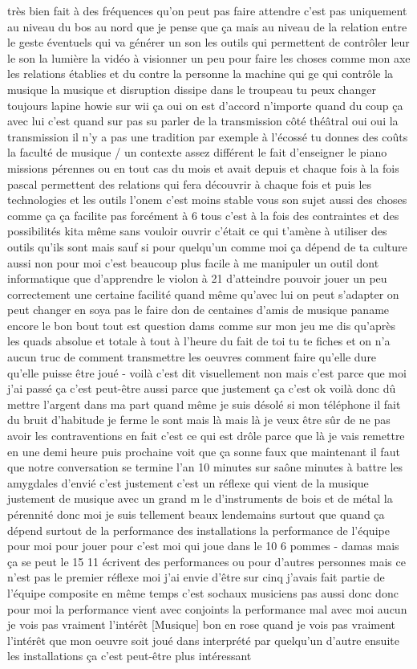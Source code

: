 très bien fait à des fréquences qu'on peut pas faire attendre c'est pas uniquement au niveau du bos au nord que je pense que ça mais au niveau de la relation entre le geste éventuels qui va générer un son les outils qui permettent de contrôler leur le son la lumière la vidéo à visionner un peu pour faire les choses comme mon axe les relations établies et du contre la personne la machine qui ge qui contrôle la musique la musique et disruption dissipe dans le troupeau tu peux changer toujours lapine howie sur wii ça oui on est d'accord n'importe quand du coup ça avec lui c'est quand sur pas su parler de la transmission côté théâtral oui oui la transmission il n'y a pas une tradition par exemple à l'écossé tu donnes des coûts la faculté de musique / un contexte assez différent le fait d'enseigner le piano missions pérennes ou en tout cas du mois et avait depuis et chaque fois à la fois pascal permettent des relations qui fera découvrir à chaque fois et puis les technologies et les outils l'onem c'est moins stable vous son sujet aussi des choses comme ça ça facilite pas forcément à 6 tous c'est à la fois des contraintes et des possibilités kita même sans vouloir ouvrir c'était ce qui t'amène à utiliser des outils qu'ils sont mais sauf si pour quelqu'un comme moi ça dépend de ta culture aussi non pour moi c'est beaucoup plus facile à me manipuler un outil dont informatique que d'apprendre le violon à 21 d'atteindre pouvoir jouer un peu correctement une certaine facilité quand même qu'avec lui on peut s'adapter on peut changer en soya pas le faire don de centaines d'amis de musique paname encore le bon bout tout est question dams comme sur mon jeu me dis qu'après les quads absolue et totale à tout à l'heure du fait de toi tu te fiches et on n'a aucun truc de comment transmettre les oeuvres comment faire qu'elle dure qu'elle puisse être joué - voilà c'est dit visuellement non mais c'est parce que moi j'ai passé ça c'est peut-être aussi parce que justement ça c'est ok voilà donc dû mettre l'argent dans ma part quand même je suis désolé si mon téléphone il fait du bruit d'habitude je ferme le sont mais là mais là je veux être sûr de ne pas avoir les contraventions en fait c'est ce qui est drôle parce que là je vais remettre en une demi heure puis prochaine voit que ça sonne faux que maintenant il faut que notre conversation se termine l'an 10 minutes sur saône minutes à battre les amygdales d'envié c'est justement c'est un réflexe qui vient de la musique justement de musique avec un grand m le d'instruments de bois et de métal la pérennité donc moi je suis tellement beaux lendemains surtout que quand ça dépend surtout de la performance des installations la performance de l'équipe pour moi pour jouer pour c'est moi qui joue dans le 10 6 pommes - damas mais ça se peut le 15 11 écrivent des performances ou pour d'autres personnes mais ce n'est pas le premier réflexe moi j'ai envie d'être sur cinq j'avais fait partie de l'équipe composite en même temps c'est sochaux musiciens pas aussi donc donc pour moi la performance vient avec conjoints la performance mal avec moi aucun je vois pas vraiment l'intérêt [Musique] bon en rose quand je vois pas vraiment l'intérêt que mon oeuvre soit joué dans interprété par quelqu'un d'autre ensuite les installations ça c'est peut-être plus intéressant 